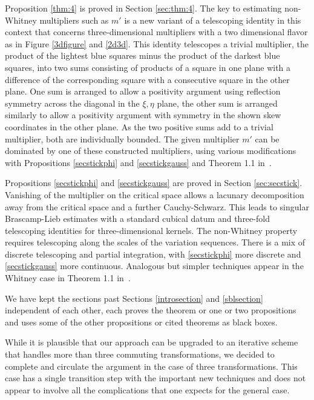 \documentclass[12pt,reqno]{amsart}
\theoremstyle{plain}
\theoremstyle{definition}
\numberwithin{equation}{section}
\begin{document}
Proposition \ref{thm:4} is proved in Section \ref{sec:thm:4}.
The key to estimating non-Whitney multipliers 
such as $m'$ 
is a new variant of a telescoping identity in this context
that concerns three-dimensional multipliers with a two
dimensional flavor as in Figure \ref{3dfigure} and \eqref{2d3d}. This identity telescopes
a trivial multiplier, the product of the lightest blue  squares minus the product of the darkest
blue squares, into two sums consisting of products of
a square in one plane with a difference of the corresponding square with a consecutive square in the other plane. One sum is arranged to allow a positivity argument
using reflection symmetry across the
diagonal in the $\xi,\eta$ plane, the other sum is arranged similarly to allow a positivity argument with symmetry in 
the shown skew coordinates in the other plane. As the two positive sums add to a trivial multiplier, both are individually bounded. The given multiplier $m'$ can be dominated by one of these constructed multipliers,
using various modifications with Propositions 
 \ref{secstickphi} and \ref{secstickgauss}
and Theorem 1.1 in~\cite{MR4510172}.

 Propositions 
 \ref{secstickphi} and \ref{secstickgauss} are proved in
 Section \ref{sec:secstick}. Vanishing of the multiplier
 on the critical space
 allows a lacunary decomposition away from the critical space 
 and a further Cauchy-Schwarz. This leads to
 singular Brascamp-Lieb estimates with a standard 
 cubical datum and three-fold telescoping identities for
 three-dimensional kernels. The non-Whitney property requires
 telescoping along the scales of the variation sequences.
 There is a mix of discrete telescoping and partial integration, with \ref{secstickphi} more discrete and
 \ref{secstickgauss} more continuous. Analogous but simpler techniques appear in  the Whitney case in Theorem 1.1 in~\cite{MR4510172}.
 
 
 









We have kept the sections past Sections 
\ref{introsection} and \ref{sblsection} independent
of each other, each proves the theorem or one or two propositions and uses some of the other propositions or cited theorems as black boxes.
 
While it is plausible that our approach can be upgraded to an iterative scheme that handles more than three commuting transformations, we decided to complete and circulate the argument in the case of three transformations.
This case has a single 
transition step with the important  new techniques and 
does not appear to involve all
the complications that one expects for the general case.
 \\
\end{document}
